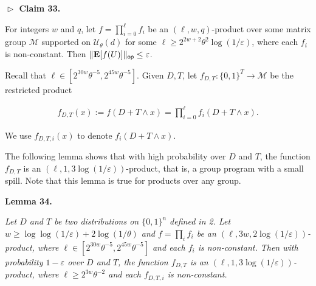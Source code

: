 

\par\medskip\noindent\textbf{
$\vartriangleright$ Claim 33. }\par



For integers $w$ and $q$, let $f=\prod_{i=0}^{\ell}f_{i}$ be an $(\ell,w,q)$-product over some matrix group $\mathcal{M}$ supported on $\mathcal{U}_{\theta}(d)$ for some $\ell\geq 2^{2w+2}\theta^{2}\log(1/\varepsilon)$, where each $f_{i}$ is non-constant.
Then $\lVert\mathop{\bf E\/}[f(U)]\rVert_{\mathsf{op}}\leq\varepsilon$.\par






Recall that $\ell\in[2^{30w}\theta^{-5},2^{45w}\theta^{-5}]$.
Given $D,T$, let $f_{D,T}\colon\{0,1\}^{T}\to\mathcal{M}$ be the restricted product\par


\[\begin{gathered}
f_{D,T}(x):=f(D+T\wedge x)=\prod_{i=0}^{\ell}f_{i}(D+T\wedge x).
\end{gathered}\]


We use $f_{D,T,i}(x)$ to denote $f_{i}(D+T\wedge x)$.\par




The following lemma shows that with high probability over $D$ and $T$, the function $f_{D,T}$ is an $(\ell,1,3\log(1/\varepsilon))$-product, that is, a group program with a small spill.
Note that this lemma is true for products over any group.\par





\par\medskip\noindent\textbf{
\textbf{Lemma 34}\textbf{.}
}\par



\emph{Let $D$ and $T$ be two distributions on $\{0,1\}^{n}$ defined in  2.
Let $w\geq\log\log(1/\varepsilon)+2\log(1/\theta)$ and $f=\prod_{i}f_{i}$ be an $(\ell,3w,2\log(1/\varepsilon))$-product, where $\ell\in[2^{30w}\theta^{-5},2^{45w}\theta^{-5}]$ and each $f_{i}$ is non-constant.
Then with probability $1-\varepsilon$ over $D$ and $T$, the function $f_{D,T}$ is an $(\ell,1,3\log(1/\varepsilon))$-product, where $\ell\geq 2^{3w}\theta^{-2}$ and each $f_{D,T,i}$ is non-constant.}\par



